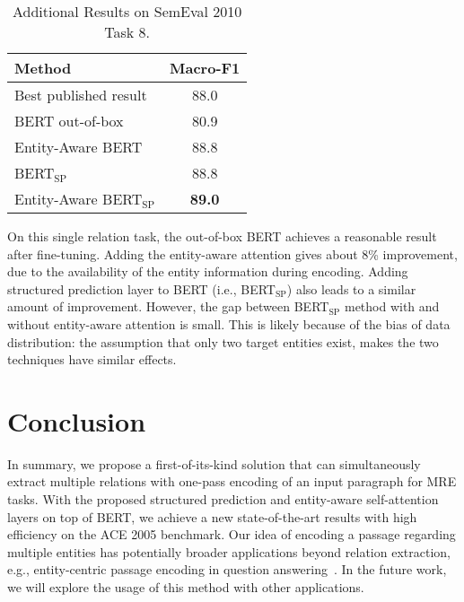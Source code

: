 \documentclass[11pt,a4paper]{article}
\begin{document}
\begin{table}[!t]
\small
\centering
\begin{tabular}{lc}
\toprule
\multicolumn{1}{l}{\textbf{Method}} & \textbf{Macro-F1} \\ \midrule
Best published result \cite{wang2016relation} & 88.0\\
\midrule
BERT out-of-box                      & 80.9         \\
Entity-Aware BERT & 88.8         \\
BERT$_{\textrm{SP}}$ & 88.8         \\
Entity-Aware BERT$_{\textrm{SP}}$ & \bf 89.0         \\ 
\bottomrule
\end{tabular}
\caption{\small Additional Results on SemEval 2010 Task 8.}
\label{tab:semeval2010}
\end{table}

On this single relation task, the out-of-box BERT achieves a reasonable result after fine-tuning. Adding the entity-aware attention gives about 8\% improvement, due to the availability of the entity information during encoding.
Adding structured prediction layer to BERT (i.e., BERT$_{\textrm{SP}}$) also leads to a similar amount of improvement.
However, the gap between BERT$_{\textrm{SP}}$ method with and without entity-aware attention is small.
This is likely because of the bias of data distribution: the assumption that only two target entities exist, makes the two techniques have similar effects.

\section{Conclusion}
In summary, we propose a first-of-its-kind solution that can simultaneously extract multiple relations with one-pass encoding of an input paragraph for MRE tasks.
With the proposed structured prediction and entity-aware self-attention layers on top of BERT, we achieve a new state-of-the-art results with high efficiency on the ACE 2005 benchmark.
Our idea of encoding a passage regarding multiple entities has potentially broader applications beyond relation extraction, e.g., entity-centric passage encoding in question answering~\cite{song2018exploring}. In the future work, we will explore the usage of this method with other applications.



\end{document}
